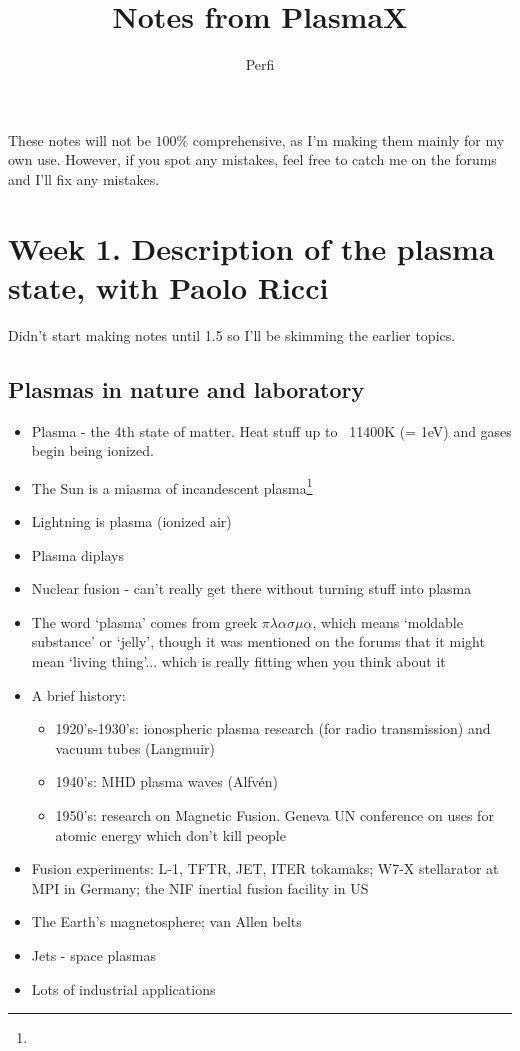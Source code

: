 
\usepackage[utf8]{inputenc}
\usepackage{graphicx}
\title{Notes from PlasmaX}
\author{Perfi}


\maketitle

These notes will not be $100\%$ comprehensive, as I'm making them mainly for my own use. However, if you spot any mistakes, feel free to catch me on the forums and I'll fix any mistakes. 

\section{Week 1. Description of the plasma state, with Paolo Ricci}
Didn't start making notes until 1.5 so I'll be skimming the earlier topics.
	\subsection{Plasmas in nature and laboratory}
		\begin{itemize}
			\item Plasma - the 4th state of matter. Heat stuff up to ~11400K (= 1eV) and gases begin being ionized.
			\item The Sun is a miasma of incandescent plasma\footnote{}
			\item Lightning is plasma (ionized air)
			\item Plasma diplays
			\item Nuclear fusion - can't really get there without turning stuff into plasma
			\item The word `plasma' comes from greek $\pi\lambda\alpha\sigma\mu\alpha$, which means `moldable substance' or `jelly', though it was mentioned on the forums that it might mean `living thing'... which is really fitting when you think about it
			\item A brief history:
				\begin{itemize}
					\item 1920's-1930's: ionospheric plasma research (for radio transmission) and vacuum tubes (Langmuir)
					\item 1940's: MHD plasma waves (Alfvén)
					\item 1950's: research on Magnetic Fusion. Geneva UN conference on uses for atomic energy which don't kill people
				\end{itemize}
			\item Fusion experiments: L-1, TFTR, JET, ITER tokamaks; W7-X stellarator at MPI in Germany; the NIF inertial fusion facility in US
			\item The Earth's magnetosphere; van Allen belts
			\item Jets - space plasmas
			\item Lots of industrial applications
		\end{itemize}
		
